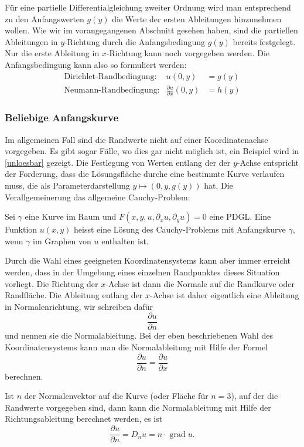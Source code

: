 Für eine partielle Differentialgleichung zweiter
Ordnung wird man entsprechend zu den Anfangswerten $g(y)$ die Werte
der ersten Ableitungen hinzunehmen wollen.
Wie wir im vorangegangenen Abschnitt gesehen haben, sind die partiellen
Ableitungen in $y$-Richtung durch die Anfangsbedingung $g(y)$ bereits
festgelegt. Nur die erste Ableitung in $x$-Richtung kann noch
vorgegeben werden. Die Anfangsbedingung kann also so formuliert
werden:
\begin{align}
&\text{Dirichlet-Randbedingung:}&
u(0,y)&=g(y)&
\label{klassifikation:dirichlet-randbedingung}
\\
&\text{Neumann-Randbedingung:}&
\frac{\partial u}{\partial x}(0,y)&=h(y)
\label{klassifikation:neumann-randbedingung}
\end{align}

\subsubsection{Beliebige Anfangskurve}
Im allgemeinen Fall sind die Randwerte nicht auf einer Koordinatenachse
vorgegeben. Es gibt sogar Fälle, wo dies gar nicht möglich ist,
ein Beispiel wird in \ref{unloesbar} gezeigt.
Die Festlegung von Werten entlang der der $y$-Achse entspricht
der Forderung, dass die Lösungsfläche durche eine bestimmte Kurve
verlaufen muss, die als Parameterdarstellung $y\mapsto (0,y,g(y))$
hat. Die Verallgemeinerung das allgemeine Cauchy-Problem:

\begin{problem} Sei $\gamma$ eine Kurve im Raum und
$F(x,y,u,\partial_xu,\partial_yu)=0$ eine PDGL. Eine Funktion $u(x,y)$
heisst eine Lösung des Cauchy-Problems mit Anfangskurve $\gamma$, wenn
$\gamma$ im Graphen von $u$ enthalten ist.
\end{problem}

Durch die Wahl eines geeigneten Koordinatensystems kann aber immer
erreicht werden, dass in der Umgebung eines einzelnen Randpunktes
dieses Situation vorliegt.
Die Richtung der $x$-Achse ist dann die Normale auf die Randkurve oder
Randfläche.
Die Ableitung entlang der $x$-Achse ist daher eigentlich eine Ableitung
in Normalenrichtung, wir schreiben dafür
\[
\frac{\partial u}{\partial n}
\]
und nennen sie die Normalableitung.
Bei der eben beschriebenen Wahl des Koordinatensystems kann man
die Normalableitung mit Hilfe der Formel
\[
\frac{\partial u}{\partial n}
=\frac{\partial u}{\partial x}
\]
berechnen.

Ist $n$ der Normalenvektor auf die Kurve (oder Fläche für $n=3$), auf
der die Randwerte vorgegeben sind, dann kann die Normalableitung mit 
Hilfe der Richtungsableitung berechnet werden, es ist
\[
\frac{\partial u}{\partial n}=D_nu = n\cdot \operatorname{grad} u.
\]

